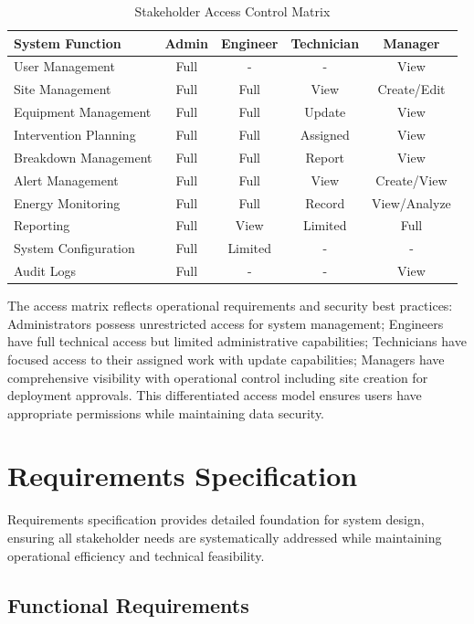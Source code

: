 \begin{table}[H]
\centering
\begin{tabular}{|l|c|c|c|c|}
\hline
\textbf{System Function} & \textbf{Admin} & \textbf{Engineer} & \textbf{Technician} & \textbf{Manager} \\
\hline
User Management & Full & - & - & View \\
\hline
Site Management & Full & Full & View & Create/Edit \\
\hline
Equipment Management & Full & Full & Update & View \\
\hline
Intervention Planning & Full & Full & Assigned & View \\
\hline
Breakdown Management & Full & Full & Report & View \\
\hline
Alert Management & Full & Full & View & Create/View \\
\hline
Energy Monitoring & Full & Full & Record & View/Analyze \\
\hline
Reporting & Full & View & Limited & Full \\
\hline
System Configuration & Full & Limited & - & - \\
\hline
Audit Logs & Full & - & - & View \\
\hline
\end{tabular}
\caption{Stakeholder Access Control Matrix}
\label{tab:stakeholder_access}
\end{table}

The access matrix reflects operational requirements and security best practices: Administrators possess unrestricted access for system management; Engineers have full technical access but limited administrative capabilities; Technicians have focused access to their assigned work with update capabilities; Managers have comprehensive visibility with operational control including site creation for deployment approvals. This differentiated access model ensures users have appropriate permissions while maintaining data security.

\section{Requirements Specification}

Requirements specification provides detailed foundation for system design, ensuring all stakeholder needs are systematically addressed while maintaining operational efficiency and technical feasibility.

\subsection{Functional Requirements}

